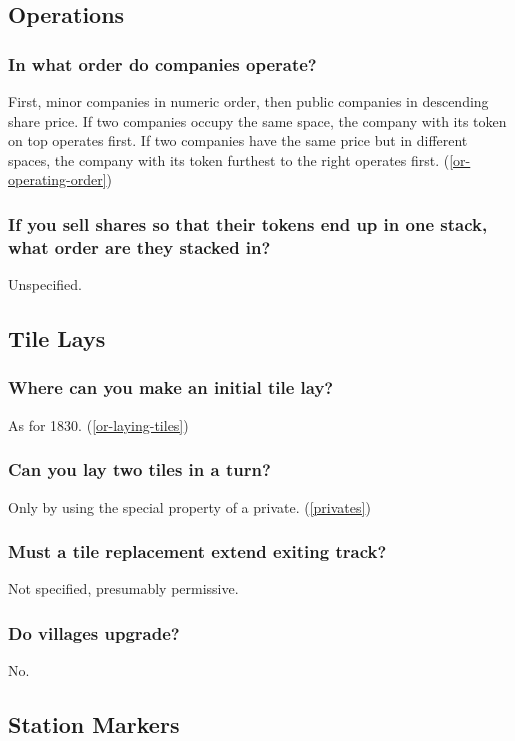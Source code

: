 \subsection{Operations}

\subsubsection{In what order do companies operate?}
First, minor companies in numeric order, then public companies in
descending share price. If two companies occupy the same space, the
company with its token on top operates first. If two companies have
the same price but in different spaces, the company with its token
furthest to the right operates first. (\autoref{or-operating-order})

\subsubsection{If you sell shares so that their tokens end up in one
  stack, what order are they stacked in?}
Unspecified.

\subsection{Tile Lays}

\subsubsection{Where can you make an initial tile lay?}
As for 1830. (\autoref{or-laying-tiles})

\subsubsection{Can you lay two tiles in a turn?}
Only by using the special property of a private. (\autoref{privates})

\subsubsection{Must a tile replacement extend exiting track?}
Not specified, presumably permissive.

\subsubsection{Do villages upgrade?}
No.

\subsection{Station Markers}

